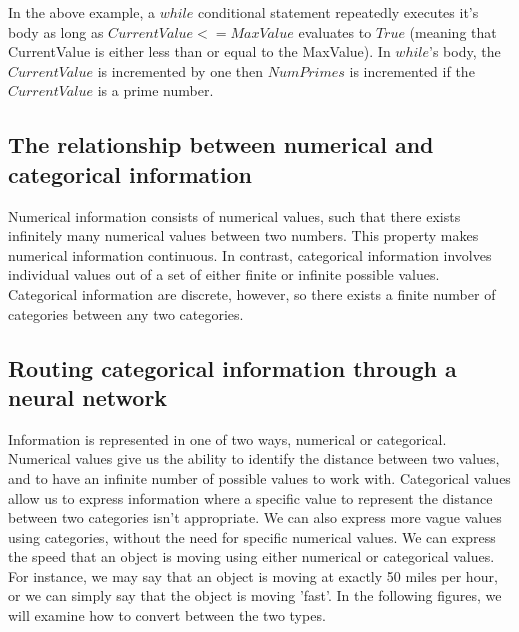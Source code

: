 \documentclass{article}
\begin{document}
	In the above example, a $while$ conditional statement repeatedly executes it's body as long as $CurrentValue <= MaxValue$ evaluates to $True$ (meaning that CurrentValue is either less than or equal to the MaxValue). In $while$'s body, the $CurrentValue$ is incremented by one then $NumPrimes$ is incremented if the $CurrentValue$ is a prime number. 



\subsection{The relationship between numerical and categorical information}

	Numerical information consists of numerical values, such that there exists infinitely many numerical values between two numbers. This property makes numerical information continuous. In contrast, categorical information involves individual values out of a set of either finite or infinite possible values. Categorical information are discrete, however, so there exists a finite number of categories between any two categories.
	

\subsection{Routing categorical information through a neural network}
	
	Information is represented in one of two ways, numerical or categorical. Numerical values give us the ability to identify the distance between two values, and to have an infinite number of possible values to work with. Categorical values allow us to express information where a specific value to represent the distance between two categories isn't appropriate. We can also express more vague values using categories, without the need for specific numerical values.
	We can express the speed that an object is moving using either numerical or categorical values. For instance, we may say that an object is moving at exactly 50 miles per hour, or we can simply say that the object is moving 'fast'. In the following figures, we will examine how to convert between the two types.
\end{document}
